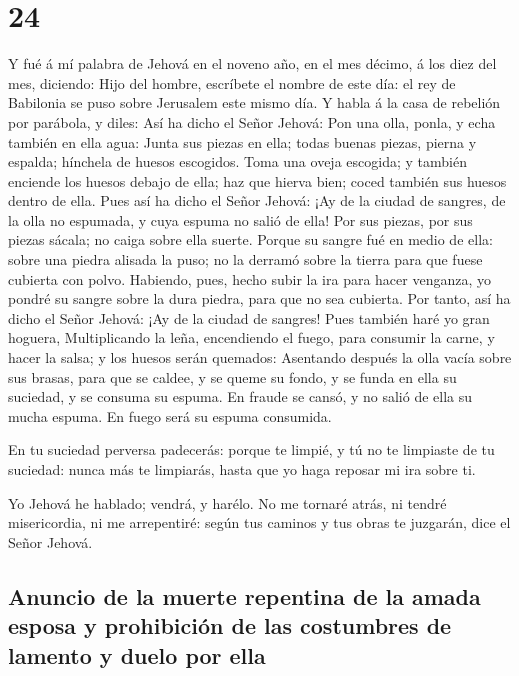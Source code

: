 \hypertarget{section-23}{%
\section{24}\label{section-23}}

 Y fué á mí palabra de Jehová en el noveno año, en el mes
décimo, á los diez del mes, diciendo:  Hijo del hombre,
escríbete el nombre de este día: el rey de Babilonia se puso sobre
Jerusalem este mismo día.  Y habla á la casa de rebelión
por parábola, y diles: Así ha dicho el Señor Jehová: Pon una olla,
ponla, y echa también en ella agua:  Junta sus piezas en
ella; todas buenas piezas, pierna y espalda; hínchela de huesos
escogidos.  Toma una oveja escogida; y también enciende
los huesos debajo de ella; haz que hierva bien; coced también sus huesos
dentro de ella.  Pues así ha dicho el Señor Jehová: ¡Ay de
la ciudad de sangres, de la olla no espumada, y cuya espuma no salió de
ella! Por sus piezas, por sus piezas sácala; no caiga sobre ella suerte.
 Porque su sangre fué en medio de ella: sobre una piedra
alisada la puso; no la derramó sobre la tierra para que fuese cubierta
con polvo.  Habiendo, pues, hecho subir la ira para hacer
venganza, yo pondré su sangre sobre la dura piedra, para que no sea
cubierta.  Por tanto, así ha dicho el Señor Jehová: ¡Ay de
la ciudad de sangres! Pues también haré yo gran hoguera, 
Multiplicando la leña, encendiendo el fuego, para consumir la carne, y
hacer la salsa; y los huesos serán quemados:  Asentando
después la olla vacía sobre sus brasas, para que se caldee, y se queme
su fondo, y se funda en ella su suciedad, y se consuma su espuma.
 En fraude se cansó, y no salió de ella su mucha espuma.
En fuego será su espuma consumida.

 En tu suciedad perversa padecerás: porque te limpié, y
tú no te limpiaste de tu suciedad: nunca más te limpiarás, hasta que yo
haga reposar mi ira sobre ti.

 Yo Jehová he hablado; vendrá, y harélo. No me tornaré
atrás, ni tendré misericordia, ni me arrepentiré: según tus caminos y
tus obras te juzgarán, dice el Señor Jehová.

\hypertarget{anuncio-de-la-muerte-repentina-de-la-amada-esposa-y-prohibiciuxf3n-de-las-costumbres-de-lamento-y-duelo-por-ella}{%
\subsection{Anuncio de la muerte repentina de la amada esposa y
prohibición de las costumbres de lamento y duelo por
ella}\label{anuncio-de-la-muerte-repentina-de-la-amada-esposa-y-prohibiciuxf3n-de-las-costumbres-de-lamento-y-duelo-por-ella}}

